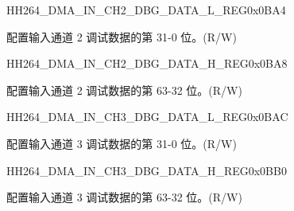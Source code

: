     
    \begin{register}{H}{H264\_DMA\_IN\_CH2\_DBG\_DATA\_L\_REG}{0x0BA4}\label{regdesc:H264DMAINCH2DBGDATALREG}
    \regnewline%
    \begin{regdesc}\begin{reglist}
    \label{fielddesc:H264INCH2DBGDATAL}\item [H264\_IN\_CH2\_DBG\_DATA\_L] 配置输入通道 2 调试数据的第 31-0 位。(R/W)
    \end{reglist}\end{regdesc}
    \end{register}
    
    
    \begin{register}{H}{H264\_DMA\_IN\_CH2\_DBG\_DATA\_H\_REG}{0x0BA8}\label{regdesc:H264DMAINCH2DBGDATAHREG}
    \regnewline%
    \begin{regdesc}\begin{reglist}
    \label{fielddesc:H264INCH2DBGDATAH}\item [H264\_IN\_CH2\_DBG\_DATA\_H] 配置输入通道 2 调试数据的第 63-32 位。(R/W)
    \end{reglist}\end{regdesc}
    \end{register}
    
    
    \begin{register}{H}{H264\_DMA\_IN\_CH3\_DBG\_DATA\_L\_REG}{0x0BAC}\label{regdesc:H264DMAINCH3DBGDATALREG}
    \regnewline%
    \begin{regdesc}\begin{reglist}
    \label{fielddesc:H264INCH3DBGDATAL}\item [H264\_IN\_CH3\_DBG\_DATA\_L] 配置输入通道 3 调试数据的第 31-0 位。(R/W)
    \end{reglist}\end{regdesc}
    \end{register}
    
    
    \begin{register}{H}{H264\_DMA\_IN\_CH3\_DBG\_DATA\_H\_REG}{0x0BB0}\label{regdesc:H264DMAINCH3DBGDATAHREG}
    \regnewline%
    \begin{regdesc}\begin{reglist}
    \label{fielddesc:H264INCH3DBGDATAH}\item [H264\_IN\_CH3\_DBG\_DATA\_H] 配置输入通道 3 调试数据的第 63-32 位。(R/W)
    \end{reglist}\end{regdesc}
    \end{register}
    
